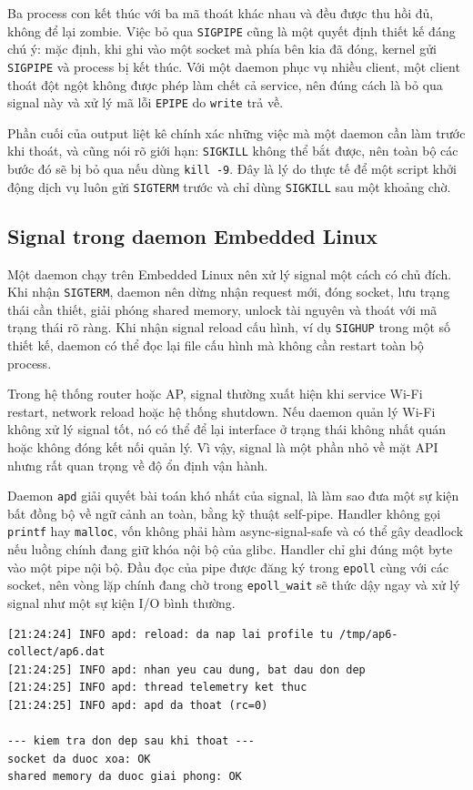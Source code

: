 \documentclass[11pt]{article}
\newcommand{\code}[1]{\texttt{#1}}
\begin{document}
Ba process con kết thúc với ba mã thoát khác nhau và đều được thu hồi đủ, không để lại zombie. Việc bỏ qua \code{SIGPIPE} cũng là một quyết định thiết kế đáng chú ý: mặc định, khi ghi vào một socket mà phía bên kia đã đóng, kernel gửi \code{SIGPIPE} và process bị kết thúc. Với một daemon phục vụ nhiều client, một client thoát đột ngột không được phép làm chết cả service, nên đúng cách là bỏ qua signal này và xử lý mã lỗi \code{EPIPE} do \code{write} trả về.

Phần cuối của output liệt kê chính xác những việc mà một daemon cần làm trước khi thoát, và cũng nói rõ giới hạn: \code{SIGKILL} không thể bắt được, nên toàn bộ các bước đó sẽ bị bỏ qua nếu dùng \code{kill -9}. Đây là lý do thực tế để một script khởi động dịch vụ luôn gửi \code{SIGTERM} trước và chỉ dùng \code{SIGKILL} sau một khoảng chờ.

\subsection{Signal trong daemon Embedded Linux}

Một daemon chạy trên Embedded Linux nên xử lý signal một cách có chủ đích. Khi nhận \code{SIGTERM}, daemon nên dừng nhận request mới, đóng socket, lưu trạng thái cần thiết, giải phóng shared memory, unlock tài nguyên và thoát với mã trạng thái rõ ràng. Khi nhận signal reload cấu hình, ví dụ \code{SIGHUP} trong một số thiết kế, daemon có thể đọc lại file cấu hình mà không cần restart toàn bộ process.

Trong hệ thống router hoặc AP, signal thường xuất hiện khi service Wi-Fi restart, network reload hoặc hệ thống shutdown. Nếu daemon quản lý Wi-Fi không xử lý signal tốt, nó có thể để lại interface ở trạng thái không nhất quán hoặc không đóng kết nối quản lý. Vì vậy, signal là một phần nhỏ về mặt API nhưng rất quan trọng về độ ổn định vận hành.

Daemon \code{apd} giải quyết bài toán khó nhất của signal, là làm sao đưa một sự kiện bất đồng bộ về ngữ cảnh an toàn, bằng kỹ thuật self-pipe. Handler không gọi \code{printf} hay \code{malloc}, vốn không phải hàm async-signal-safe và có thể gây deadlock nếu luồng chính đang giữ khóa nội bộ của glibc. Handler chỉ ghi đúng một byte vào một pipe nội bộ. Đầu đọc của pipe được đăng ký trong \code{epoll} cùng với các socket, nên vòng lặp chính đang chờ trong \code{epoll\_wait} sẽ thức dậy ngay và xử lý signal như một sự kiện I/O bình thường.

\begin{lstlisting}[caption={Log daemon: SIGHUP nạp lại cấu hình, SIGTERM thoát có kiểm soát}]
[21:24:24] INFO apd: reload: da nap lai profile tu /tmp/ap6-collect/ap6.dat
[21:24:25] INFO apd: nhan yeu cau dung, bat dau don dep
[21:24:25] INFO apd: thread telemetry ket thuc
[21:24:25] INFO apd: apd da thoat (rc=0)

--- kiem tra don dep sau khi thoat ---
socket da duoc xoa: OK
shared memory da duoc giai phong: OK
\end{lstlisting}
\end{document}
